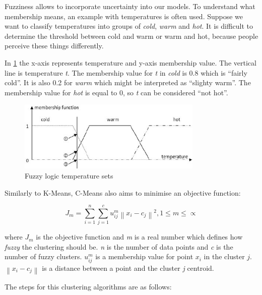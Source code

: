 Fuzziness allows to incorporate uncertainty into our models. To understand what membership means, an example with temperatures is often used. Suppose we want to classify temperatures into groups of \textit{cold}, \textit{warm} and \textit{hot}. It is difficult to determine the threshold between cold and warm or warm and hot, because people perceive these things differently. 

In \ref{fig:fuzzy} the x-axis represents temperature and y-axis membership value. The vertical line is temperature \textit{t}. The membership value for \textit{t} in \textit{cold} is 0.8 which is ``fairly cold''. It is also 0.2 for \textit{warm} which might be interpreted as ``slighty warm''. The membership value for \textit{hot} is equal to 0, so \textit{t} can be considered ``not hot''.  

\begin{figure}[ht]
    \centering
    \includegraphics[width=250pt]{images/fuzzy.jpg}
    \caption{Fuzzy logic temperature sets}
    \label{fig:fuzzy}
\end{figure}

Similarly to K-Means, C-Means also aims to minimise an objective function:

\begin{equation}
\label{eq:objective-cmeans}
    J_{m} = \sum_{i=1}^{n}\sum_{j=1}^{c}u_{ij}^{m}\left \| x_{i} - c_{j} \right \|^{2}, 1\leq m\leq \propto 
\end{equation}

where \textit{$J_m$} is the objective function and \textit{m} is a real number which defines how \textit{fuzzy} the clustering should be. \textit{n} is the number of data points and \textit{c} is the number of fuzzy clusters. \textit{$u_{ij}^{m}$} is a membership value for point \textit{$x_i$} in the cluster \textit{$j$}. \textit{$\left \| x_{i} - c_{j} \right \|$} is a distance between a point and the cluster \textit{j} centroid.

The steps for this clustering algorithms are as follows:

